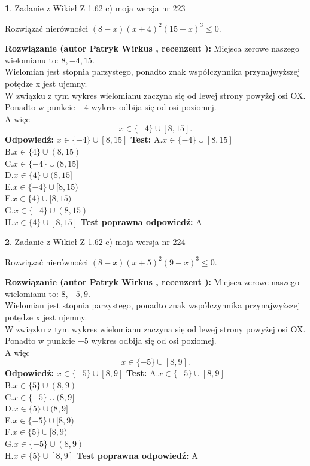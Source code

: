 \documentclass[12pt, a4paper]{article}
\theoremstyle{definition} %
\newtheorem{zad}{}
\newcommand{\zadStart}[1]{\begin{zad}#1\newline}
\newcommand{\zadStop}{\end{zad}}
\newcommand{\rozwStart}[2]{\noindent \textbf{Rozwiązanie (autor #1 , recenzent #2): }\newline}
\newcommand{\rozwStop}{\newline}
\newcommand{\odpStart}{\noindent \textbf{Odpowiedź:}\newline}
\newcommand{\odpStop}{\newline}
\newcommand{\testStart}{\noindent \textbf{Test:}\newline}
\newcommand{\testStop}{\newline}
\newcommand{\kluczStart}{\noindent \textbf{Test poprawna odpowiedź:}\newline}
\newcommand{\kluczStop}{\newline}
\begin{document}
\zadStart{Zadanie z Wikieł Z 1.62 c) moja wersja nr 223}

Rozwiązać nierówności $(8-x)(x+4)^{2}(15-x)^{3}\le0$.
\zadStop
\rozwStart{Patryk Wirkus}{}
Miejsca zerowe naszego wielomianu to: $8, -4, 15$.\\
Wielomian jest stopnia parzystego, ponadto znak współczynnika przy\linebreak najwyższej potędze x jest ujemny.\\ W związku z tym wykres wielomianu zaczyna się od lewej strony powyżej osi OX.\\
Ponadto w punkcie $-4$ wykres odbija się od osi poziomej.\\
A więc $$x \in \{-4\} \cup [8,15].$$
\rozwStop
\odpStart
$x \in \{-4\} \cup [8,15]$
\odpStop
\testStart
A.$x \in \{-4\} \cup [8,15]$\\
B.$x \in \{4\} \cup (8,15)$\\
C.$x \in \{-4\} \cup (8,15]$\\
D.$x \in \{4\} \cup (8,15]$\\
E.$x \in \{-4\} \cup [8,15)$\\
F.$x \in \{4\} \cup [8,15)$\\
G.$x \in \{-4\} \cup (8,15)$\\
H.$x \in \{4\} \cup [8,15]$
\testStop
\kluczStart
A
\kluczStop



\zadStart{Zadanie z Wikieł Z 1.62 c) moja wersja nr 224}

Rozwiązać nierówności $(8-x)(x+5)^{2}(9-x)^{3}\le0$.
\zadStop
\rozwStart{Patryk Wirkus}{}
Miejsca zerowe naszego wielomianu to: $8, -5, 9$.\\
Wielomian jest stopnia parzystego, ponadto znak współczynnika przy\linebreak najwyższej potędze x jest ujemny.\\ W związku z tym wykres wielomianu zaczyna się od lewej strony powyżej osi OX.\\
Ponadto w punkcie $-5$ wykres odbija się od osi poziomej.\\
A więc $$x \in \{-5\} \cup [8,9].$$
\rozwStop
\odpStart
$x \in \{-5\} \cup [8,9]$
\odpStop
\testStart
A.$x \in \{-5\} \cup [8,9]$\\
B.$x \in \{5\} \cup (8,9)$\\
C.$x \in \{-5\} \cup (8,9]$\\
D.$x \in \{5\} \cup (8,9]$\\
E.$x \in \{-5\} \cup [8,9)$\\
F.$x \in \{5\} \cup [8,9)$\\
G.$x \in \{-5\} \cup (8,9)$\\
H.$x \in \{5\} \cup [8,9]$
\testStop
\kluczStart
A
\kluczStop
\end{document}
